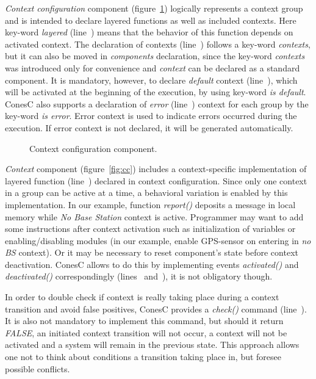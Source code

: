 \emph{Context configuration} component (figure~\ref{fig:ccc}) logically
represents a context group and is intended to declare layered functions as well
as included contexts. Here key-word \emph{layered} (line~)
means that the behavior of this function depends on activated context. The
declaration of contexts (line~) follows a key-word
\emph{contexts}, but it can also be moved in \emph{components} declaration,
since the key-word \emph{contexts} was introduced only for convenience and
\emph{context} can be declared as a standard component. It is mandatory,
however, to declare \emph{default} context (line~), which will
be activated at the beginning of the execution, by using key-word \emph{is
default}. ConesC also supports a declaration of \emph{error}
(line~) context for each group by the key-word \emph{is error}.
Error context is used to indicate errors occurred during the execution. If error
context is not declared, it will be generated automatically.


\begin{figure}[!h]
\TheSbox
\caption{Context configuration
component.}
\label{fig:ccc}
\end{figure}

\emph{Context} component (figure~\ref{fig:cc}) includes a context-specific
implementation of layered function (line~) declared in
context configuration. Since only one context in a group can be active at a
time, a behavioral variation is enabled by this implementation. In our example,
function \emph{report()} deposits a message in local memory while \emph{No Base
Station} context is active. Programmer may want to add some instructions after
context activation such as initialization of variables or enabling/disabling
modules (in our example, enable GPS-sensor on entering in \emph{no BS} context).
Or it may be necessary to reset component's state before context deactivation.
ConesC allows to do this by implementing events \emph{activated()} and
\emph{deactivated()} correspondingly (lines~
and~), it is not obligatory though.

In order to double check if context is really taking place during a context
transition and avoid false positives, ConesC provides a \emph{check()} command
(line~). It is also not mandatory to implement this command, but
should it return \emph{FALSE}, an initiated context transition will not occur, a
context will not be activated and a system will remain in the previous state.
This approach allows one not to think about conditions a transition taking place
in, but foresee possible conflicts.

